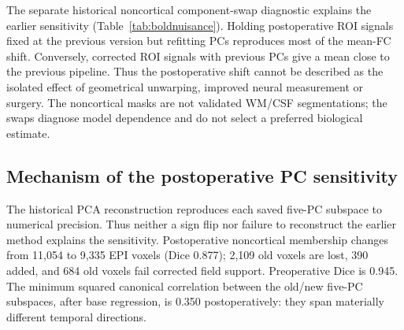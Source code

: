 \documentclass[11pt,a4paper]{article}
\begin{document}
The separate historical noncortical component-swap diagnostic explains the earlier sensitivity (Table~\ref{tab:boldnuisance}). Holding postoperative ROI signals fixed at the previous version but refitting PCs reproduces most of the mean-FC shift. Conversely, corrected ROI signals with previous PCs give a mean close to the previous pipeline. Thus the postoperative shift cannot be described as the isolated effect of geometrical unwarping, improved neural measurement or surgery. The noncortical masks are not validated WM/CSF segmentations; the swaps diagnose model dependence and do not select a preferred biological estimate.
\begin{table}[H]\centering\small
\caption{Historical noncortical-PC diagnostic (not the current primary model): cross ROI signals and five nuisance PCs while holding motion, temporal design and censoring fixed. Only the all-previous and all-corrected rows are complete pipelines. The mixed rows are diagnostic counterfactual processing choices.}\label{tab:boldnuisance}\end{table}

\subsection{Mechanism of the postoperative PC sensitivity}
The historical PCA reconstruction reproduces each saved five-PC subspace to numerical precision. Thus neither a sign flip nor failure to reconstruct the earlier method explains the sensitivity. Postoperative noncortical membership changes from 11,054 to 9,335 EPI voxels (Dice 0.877); 2,109 old voxels are lost, 390 added, and 684 old voxels fail corrected field support. Preoperative Dice is 0.945. The minimum squared canonical correlation between the old/new five-PC subspaces, after base regression, is 0.350 postoperatively: they span materially different temporal directions.
\end{document}
